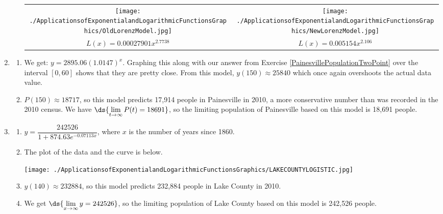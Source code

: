 \documentclass{ximera}
\begin{document}
\begin{enumerate}
\begin{enumerate}
\begin{center}

\begin{tabular}{cc}

\texttt{[image: ./ApplicationsofExponentialandLogarithmicFunctionsGraphics/OldLorenzModel.jpg]}  &

\hspace{1in}

\texttt{[image: ./ApplicationsofExponentialandLogarithmicFunctionsGraphics/NewLorenzModel.jpg]}  \\

 $L(x) = 0.00027901x^{2.7738}$

&

\hspace{1in}
$L(x) = 0.005154 x^{2.106}$ \\

\end{tabular}

\end{center}

\end{enumerate}


\item  \begin{enumerate}  \item   We get:  $y = 2895.06 (1.0147)^{x}$.  Graphing this along with our answer from Exercise \ref{PainesvillePopulationTwoPoint} over the interval $[0,60]$ shows that they are pretty close. From this model, $y(150) \approx 25840$ which once again overshoots the actual data value.

\item $P(150) \approx 18717$, so this model predicts 17,914 people in Painesville in 2010, a more conservative number than was recorded in the 2010 census.  We have $\ds{\lim_{t \rightarrow \infty} P(t) =  18691}$,  so the limiting population of Painesville based on this model is 18,691 people.

\enlargethispage{\baselineskip}

\end{enumerate}

\item \begin{enumerate}  \item  $y = \dfrac{242526}{1+874.63e^{-0.07113x}}$, where $x$ is the number of years since 1860.

\item  The plot of the data and the curve is below.

\centerline{\texttt{[image: ./ApplicationsofExponentialandLogarithmicFunctionsGraphics/LAKECOUNTYLOGISTIC.jpg]}} 

\item  $y(140) \approx 232884$, so this model predicts 232,884 people in Lake County in 2010.

\item  We get $\ds{\lim_{x \rightarrow \infty} y = 242526}$, so the limiting population of Lake County based on this model is 242,526 people.

\end{enumerate}

\end{enumerate}
\end{document}
